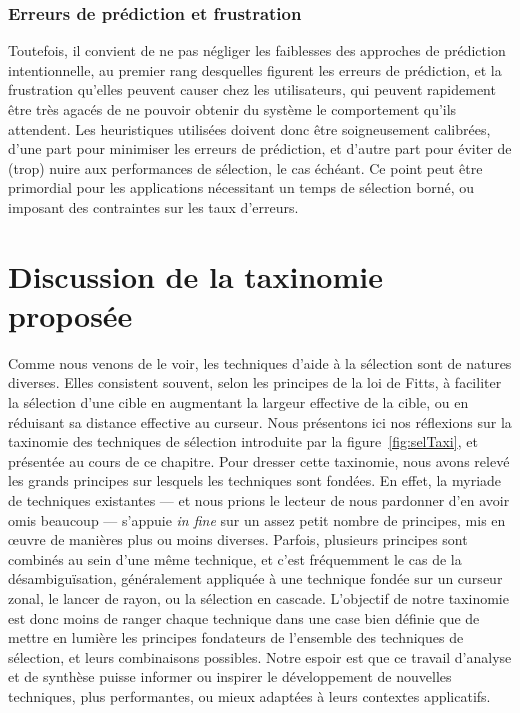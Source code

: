 	\subsubsection{Erreurs de prédiction et frustration}
	Toutefois, il convient de ne pas négliger les faiblesses des approches de prédiction intentionnelle, au premier rang desquelles figurent les erreurs de prédiction, et la frustration qu'elles peuvent causer chez les utilisateurs, qui peuvent rapidement être très agacés de ne pouvoir obtenir du système le comportement qu'ils attendent. Les heuristiques utilisées doivent donc être soigneusement calibrées, d'une part pour minimiser les erreurs de prédiction, et d'autre part pour éviter de (trop) nuire aux performances de sélection, le cas échéant. Ce point peut être primordial pour les applications nécessitant un temps de sélection borné, ou imposant des contraintes sur les taux d'erreurs.
	
\section{Discussion de la taxinomie proposée}
    Comme nous venons de le voir, les techniques d'aide à la sélection sont de natures diverses. Elles consistent souvent, selon les principes de la loi de Fitts, à faciliter la sélection d'une cible en augmentant la largeur effective de la cible, ou en réduisant sa distance effective au curseur. Nous présentons ici nos réflexions sur la taxinomie des techniques de sélection introduite par la figure~\ref{fig:selTaxi}, et présentée au cours de ce chapitre. Pour dresser cette taxinomie, nous avons relevé les grands principes sur lesquels les techniques sont fondées. En effet, la myriade de techniques existantes --- et nous prions le lecteur de nous pardonner d'en avoir omis beaucoup --- s'appuie \emph{in fine} sur un assez petit nombre de principes, mis en œuvre de manières plus ou moins diverses. Parfois, plusieurs principes sont combinés au sein d'une même technique, et c'est fréquemment le cas de la désambiguïsation, généralement appliquée à une technique fondée sur un curseur zonal, le lancer de rayon, ou la sélection en cascade. L'objectif de notre taxinomie est donc moins de ranger chaque technique dans une case bien définie que de mettre en lumière les principes fondateurs de l'ensemble des techniques de sélection, et leurs combinaisons possibles. Notre espoir est que ce travail d'analyse et de synthèse puisse informer ou inspirer le développement de nouvelles techniques, plus performantes, ou mieux adaptées à leurs contextes applicatifs.
    
